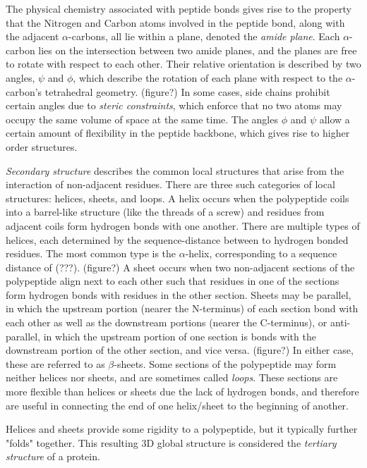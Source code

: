 The physical chemistry associated with peptide bonds gives rise to the property that the Nitrogen and Carbon atoms involved in the peptide bond, along with the adjacent $\alpha$-carbons, all lie within a plane, denoted the \textit{amide plane}.
Each $\alpha$-carbon lies on the intersection between two amide planes, and the planes are free to rotate with respect to each other. 
Their relative orientation is described by two angles, $\psi$ and $\phi$, which describe the rotation of each plane with respect to the $\alpha$-carbon's tetrahedral geometry. (figure?)
In some cases, side chains prohibit certain angles due to \textit{steric constraints}, which enforce that no two atoms may occupy the same volume of space at the same time.
The angles $\phi$ and $\psi$ allow a certain amount of flexibility in the peptide backbone, which gives rise to higher order structures.

\textit{Secondary structure} describes the common local structures that arise from the interaction of non-adjacent residues.
There are three such categories of local structures: helices, sheets, and loops.
A helix occurs when the polypeptide coils into a barrel-like structure (like the threads of a screw) and residues from adjacent coils form hydrogen bonds with one another.
There are multiple types of helices, each determined by the sequence-distance between to hydrogen bonded residues.
The most common type is the $\alpha$-helix, corresponding to a sequence distance of (???). (figure?)
A sheet occurs when two non-adjacent sections of the polypeptide align next to each other such that residues in one of the sections form hydrogen bonds with residues in the other section.
Sheets may be parallel, in which the upstream portion (nearer the N-terminus) of each section bond with each other as well as the downstream portions (nearer the C-terminus), or anti-parallel, in which the upstream portion of one section is bonds with the downstream portion of the other section, and vice versa. (figure?)
In either case, these are referred to as $\beta$-sheets. 
Some sections of the polypeptide may form neither helices nor sheets, and are sometimes called \textit{loops}.
These sections are more flexible than helices or sheets due the lack of hydrogen bonds, and therefore are useful in connecting the end of one helix/sheet to the beginning of another. 

Helices and sheets provide some rigidity to a polypeptide, but it typically further "folds" together. This resulting 3D global structure is considered the \textit{tertiary structure} of a protein. 

